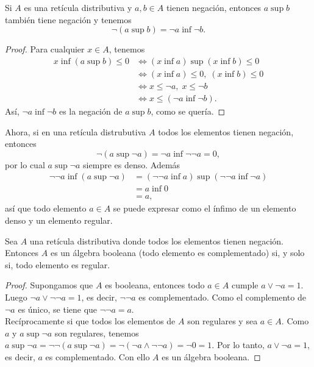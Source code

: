 \begin{proposition}
  Si $A$ es una retícula distributiva y $a,b\in A$ tienen
  negación, entonces $a\sup b$ también tiene negación y tenemos
  \[
    \neg(a\sup b) = \neg a \inf \neg b
  .\]
\end{proposition}
\begin{proof}
  Para cualquier $x\in A$, tenemos
  \begin{align*}
    x\inf(a\sup b) \leq 0
    &\iff (x\inf a)\sup(x\inf b) \leq 0 \\
    &\iff (x\inf a)\leq 0, \; (x\inf b) \leq 0 \\
    &\iff x\leq\neg a, \; x\leq\neg b \\
    &\iff x\leq(\neg a \inf \neg b).
  \end{align*}
  Así, $\neg a\inf\neg b$ es la negación de $a\sup b$, como se
  quería.
\end{proof}

Ahora, si en una retícula distrubutiva $A$ todos los elementos
tienen negación, entonces
\[
  \neg(a\sup\neg a) = \neg a\inf\neg\neg a = 0
,\]
por lo cual $a\sup\neg a$ siempre es denso.
Además
\begin{align*}
  \neg\neg a\inf(a\sup\neg a)
  &= (\neg\neg a\inf a)\sup(\neg\neg a\inf\neg a) \\
  &= a \inf 0 \\
  &= a,
\end{align*}
así que todo elemento $a\in A$ se puede expresar como el ínfimo
de un elemento denso y un elemento regular.

\begin{lemma}
  Sea $A$ una retícula distributiva donde todos los elementos
  tienen negación.
  Entonces $A$ es un álgebra booleana (todo elemento es
  complementado) si, y solo si, todo elemento es regular.
\end{lemma}
\begin{proof}
     Supongamos que $A$ es booleana, entonces todo
    $a\in A$ cumple $a\vee \neg a=1$.
    Luego $\neg a\vee \neg\neg a=1$, es decir, $\neg\neg a$ es
    complementado.
    Como el complemento de $\neg a$ es único, se tiene que $\neg
    \neg a=a$. \\ 
    Recíprocamente si que todos los elementos de $A$ son
    regulares y sea $a\in A$.
    Como $a$ y $a\sup\neg a$ son regulares, tenemos
    $a\sup\neg a=\neg\neg (a\sup\neg a)=\neg(\neg
    a\wedge \neg\neg a)=\neg 0=1$.
    Por lo tanto, $a\vee \neg a=1$, es decir, $a$ es
    complementado. Con ello $A$ es un álgebra booleana.
\end{proof}

